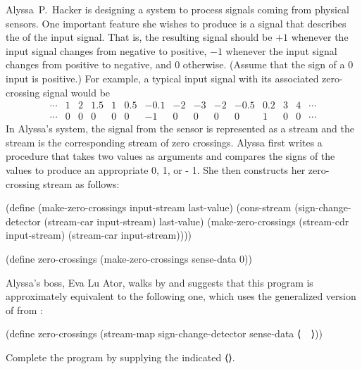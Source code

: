 \begin{exercise}
	\label{Exercise 3.74}
	Alyssa~P.~Hacker is designing a system to process signals coming from physical sensors.
	One important feature she wishes to produce is a signal that describes the  of the input signal.
	That is, the resulting signal should be \( +1 \) whenever the input signal changes from negative to positive, \( -1 \) whenever the input signal changes from positive to negative, and \( 0 \) otherwise.
	(Assume that the sign of a \( 0 \) input is positive.)
	For example, a typical input signal with its associated zero-crossing signal would be
	\[
		\begin{array}{crrrrrrrrrrrrrc}
			⋯ & 1 & 2 & 1.5 & 1 & 0.5 & -0.1 & -2 & -3 & -2 & -0.5 & 0.2 & 3 & 4 & ⋯ \\
			⋯ & 0 & 0 &   0 & 0 &   0 &   -1 &  0 &  0 &  0 &    0 &   1 & 0 & 0 & ⋯
		\end{array}
	\]
	In Alyssa’s system, the signal from the sensor is represented as a stream  and the stream  is the corresponding stream of zero crossings.
	Alyssa first writes a procedure  that takes two values as arguments and compares the signs of the values to produce an appropriate 0, 1, or - 1.
	She then constructs her zero-crossing stream as follows:
	\begin{scheme}
	  (define (make-zero-crossings input-stream last-value)
	    (cons-stream
	     (sign-change-detector
	      (stream-car input-stream)
	      last-value)
	     (make-zero-crossings
	      (stream-cdr input-stream)
	      (stream-car input-stream))))

	  (define zero-crossings
	    (make-zero-crossings sense-data 0))
	\end{scheme}
	Alyssa’s boss, Eva Lu Ator, walks by and suggests that this program is approximately equivalent to the following one, which uses the generalized version of  from :
	\begin{scheme}
	  (define zero-crossings
	    (stream-map sign-change-detector
	                sense-data
	                ⟨~~⟩))
	\end{scheme}
	Complete the program by supplying the indicated ⟨⟩.
\end{exercise}



